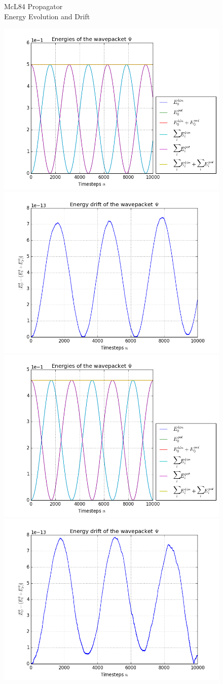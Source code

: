 \begin{figure}[ht]
	\centering
	\begin{minipage}[c]{\textwidth}
		\begin{center}
			\large McL84 Propagator \\[1mm]
			\normalsize Energy Evolution and Drift
			\vspace{4mm}
		\end{center}
	\end{minipage}
	\includegraphics[width=.45\textwidth]{figures/harmonic_1D_McL84_energies.png}
	\includegraphics[width=.45\textwidth]{figures/harmonic_1D_McL84_drift.png} \\
	\includegraphics[width=.45\textwidth]{figures/torsional_1D_McL84_energies.png}
	\includegraphics[width=.45\textwidth]{figures/torsional_1D_McL84_drift.png} \\

\end{figure}
